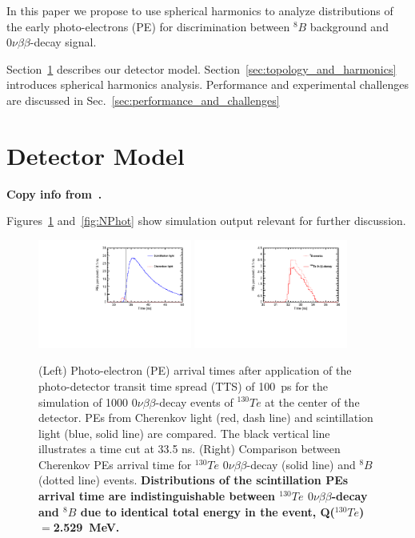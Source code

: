 \documentclass[12pt,twoside,letterpaper]{article}
\newcommand{\vbb}{0\nu\beta\beta}
\newcommand{\Te}{^{130}Te}
\newcommand{\B}{^{8}B}
\begin{document}
In this paper we propose to use spherical harmonics to analyze distributions of the early photo-electrons (PE) for discrimination between $\B$ background and $\vbb$-decay signal.

Section~\ref{sec:detector_description} describes our detector model. Section~\ref{sec:topology_and_harmonics} introduces spherical harmonics analysis. Performance and experimental challenges are discussed in Sec.~\ref{sec:performance_and_challenges}


\section{Detector Model}
\label{sec:detector_description}
{\bf Copy info from~\cite{Directionality}.

Figures~\ref{fig:Arrival_time} and~\ref{fig:NPhot} show simulation output relevant for further discussion.}

\begin{figure}[htb]
\centering
\includegraphics[angle=0,width=0.45\textwidth]{plots/hT_Te130.pdf}
\includegraphics[angle=0,width=0.45\textwidth]{plots/hTche_Te130_B8.pdf}
\caption{(Left) Photo-electron (PE) arrival times after application of the photo-detector transit time spread (TTS) of 100~ps for the simulation of 1000 $\vbb$-decay events of $\Te$ at the center of the detector. PEs from Cherenkov light (red, dash line) and scintillation light (blue, solid
line) are compared. The black vertical line illustrates a time cut at 33.5 ns. (Right) Comparison between Cherenkov PEs arrival time for $\Te$ $\vbb$-decay (solid line) and $\B$ (dotted line) events. {\bf Distributions of the scintillation PEs arrival time are indistinguishable between $\Te$ $\vbb$-decay and $\B$ due to identical total energy in the event, Q($\Te$)$=$2.529~MeV.} }
\label{fig:Arrival_time}
\end{figure}
\end{document}
